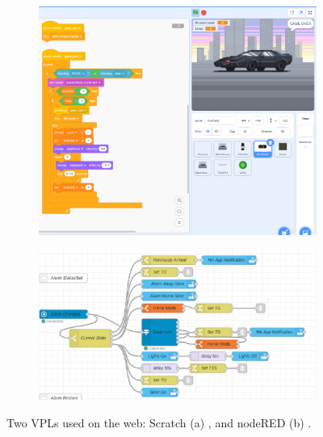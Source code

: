 \begin{figure}
\centering
\begin{subfigure}[b]{0.45\linewidth}
  \graphicspath{{../../assets/images/background/web-vpl/}}
  \centering
  \includegraphics[width=\linewidth]{scratch-2.png}
  \caption{}\label{fig:webvpl:1}
\end{subfigure}%
\qquad 
\begin{subfigure}[b]{0.45\linewidth}
  \graphicspath{{../../assets/images/background/web-vpl/}}
  \centering
  \includegraphics[width=\linewidth]{nodered-2.png}
  \caption{}\label{fig:webvpl:2}
\end{subfigure}%
\caption[web VPLs]{Two VPLs used on the web: Scratch (a) \citep{resnick_scratch_2009}, and nodeRED (b) \citep{openjs_foundation_node-red_2022}. }
\label{fig:webvpl}
\end{figure}

